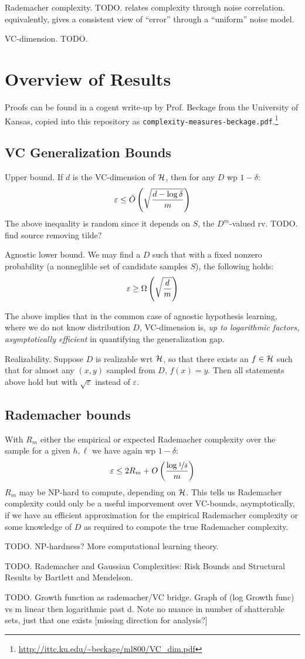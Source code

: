 \documentclass{article}
\begin{document}
Rademacher complexity. TODO. relates complexity through noise correlation. equivalently, gives a consistent view of ``error'' through a ``uniform'' noise model.

VC-dimension. TODO.

\section{Overview of Results}

Proofs can be found in a cogent write-up by Prof. Beckage from the University of Kansas, copied into this repository as \texttt{complexity-measures-beckage.pdf}.\footnote{\url{http://ittc.ku.edu/~beckage/ml800/VC_dim.pdf}}

\subsection{VC Generalization Bounds}

Upper bound. If $d$ is the VC-dimension of ${\mathcal{H}}$, then for any $D$ wp $1-\delta$:
$$
\varepsilon\le \tilde{O}\left({\sqrt{\frac{d-\log \delta}{m}}}\right)
$$
The above inequality is random since it depends on $S$, the $D^m$-valued rv. TODO. find source removing tilde?

Agnostic lower bound. We may find a $D$ such that with a fixed nonzero probability (a nonneglible set of candidate samples $S$), the following holds:
$$
\varepsilon\ge \Omega\left({\sqrt{\frac{d}{m}}}\right)
$$

The above implies that in the common case of agnostic hypothesis learning, where we do not know distribution $D$, VC-dimension is, \textit{up to logarithmic factors, asymptotically efficient} in quantifying the generalization gap.

Realizability. Suppose $D$ is realizable wrt ${\mathcal{H}}$, so that there exists an $f\in{\mathcal{H}}$ such that for almost any $(x,y)$ sampled from $D$, $f(x)=y$. Then all statements above hold but with $\sqrt{\varepsilon}$ instead of $\varepsilon$.


\subsection{Rademacher bounds}

With $R_m$ either the empirical or expected Rademacher complexity over the sample for a given $h,\ell$ we have again wp $1-\delta$:
$$
\varepsilon\le 2R_m+O\left({\frac{\log\nicefrac{1}{\delta}}{m}}\right)
$$
$R_m$ may be NP-hard to compute, depending on ${\mathcal{H}}$. This tells us Rademacher complexity could only be a useful imporvement over VC-bounds, asymptotically, if we have an efficient approximation for the empirical Rademacher complexity or some knowledge of $D$ as required to compote the true Rademacher complexity.

TODO. NP-hardness? More computational learning theory.

TODO. Rademacher and Gaussian Complexities: Risk Bounds and Structural Results by Bartlett and Mendelson.

TODO. Growth function as rademacher/VC bridge. Graph of (log Growth func) vs m linear then logarithmic past d. Note no nuance in number of shatterable sets, just that one exists [missing direction for analysis?]
\end{document}
